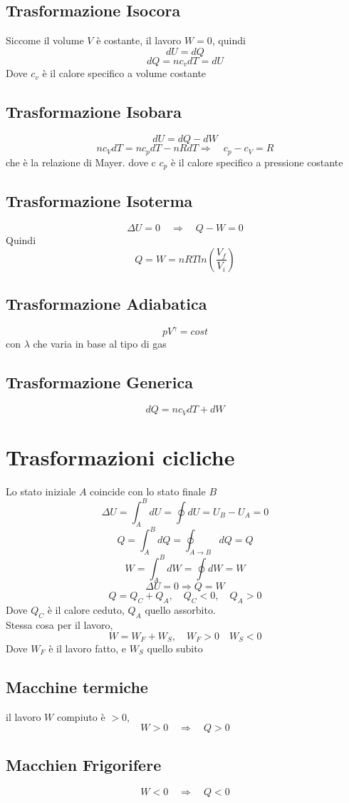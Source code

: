 \documentclass[a4paper]{report}
\begin{document}
  \subsection{Trasformazione Isocora}
  Siccome il volume $V$ è costante, il lavoro $W = 0$, quindi
  \[ dU=dQ \]
  \[ dQ = nc_vdT = dU\]
  Dove $c_v$ è il calore specifico a volume costante
  \subsection{Trasformazione Isobara}
  \[ dU = dQ-dW \]
  \[ n c_V dT = n c_p dT - nR dT \Rightarrow \quad c_p -c_V = R \]
  che è la relazione di Mayer. dove c $c_p$ è il calore specifico a pressione costante
  \subsection{Trasformazione Isoterma}
  \[ \Delta U = 0 \quad \Rightarrow \quad Q-W =0 \]
  Quindi
  \[ Q = W = n R T ln(\frac{V_f}{V_i}) \]
  \subsection{Trasformazione Adiabatica}
  \[ p V^{\gamma} = cost \]
  con $\lambda$ che varia in base al tipo di gas
  \subsection{Trasformazione Generica}
  \[ dQ = nc_V dT + dW \]

  \section{Trasformazioni cicliche}
  Lo stato iniziale $A$ coincide con lo stato finale $B$
  \[ \Delta U = \int_A^B dU = \oint dU = U_B - U_A = 0 \]
  \[ Q = \int_A^B dQ = \oint_{A \rightarrow B} dQ = Q \]
  \[ W = \int_A^B dW = \oint dW = W \]
  \[ \Delta U = 0 \Rightarrow Q = W \]
  \[ Q = Q_C + Q_A,  \quad Q_C < 0, \quad Q_A > 0 \]
  Dove $Q_C$ è il calore ceduto, $Q_A$ quello assorbito.\\
  Stessa cosa per il lavoro,
  \[ W = W_F + W_S, \quad W_F > 0  \quad W_S < 0 \]
  Dove $W_F$ è il lavoro fatto, e $W_S$ quello subito
  \subsection{Macchine termiche}
  il lavoro $W$ compiuto è $>0$,
  \[ W>0 \quad \Rightarrow \quad Q > 0 \]
  \subsection{Macchien Frigorifere}
  \[ W<0 \quad \Rightarrow \quad Q < 0 \]
\end{document}
